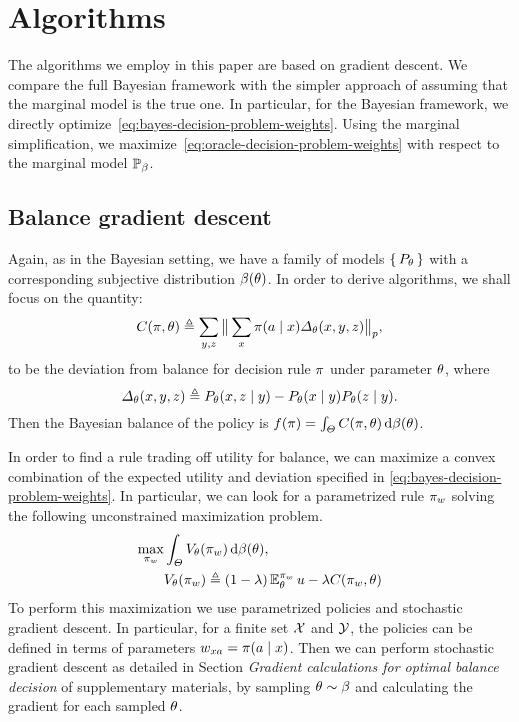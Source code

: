 \section{Algorithms} 
\label{sec:optim-balanc-bayes}
 
The algorithms we employ in this paper are based on gradient descent. We compare the full Bayesian framework with the simpler approach of assuming that the marginal model is the true one. In particular, for the Bayesian framework, we directly optimize~\eqref{eq:bayes-decision-problem-weights}. Using the marginal simplification, we maximize~\eqref{eq:oracle-decision-problem-weights} with respect to the marginal model $\mathop{\mbox{\ensuremath{\mathbb{P}}}}\nolimits_\beta$.


\subsection{Balance gradient descent}
\label{sec:credible-fairness}

Again, as in the Bayesian setting, we have a family of models
$\left\{\, P_\theta \,\right\}$ with a corresponding subjective distribution
$\beta(\theta)$. In order to derive algorithms, we shall focus on the quantity:
\begin{equation}
  C(\pi, \theta)
   \mathrel{\triangleq}
   \sum_{y,z} \big\|\sum_x \pi(a \mid x)  \Delta_\theta(x,y,z)\big\|_p,
\end{equation}
to be the deviation from balance for decision rule $\pi$ under
parameter $\theta$, where
\begin{equation}
  \Delta_\theta(x,y,z) \mathrel{\triangleq} P_\theta(x, z \mid y)
  - P_\theta(x \mid y) P_\theta(z \mid y).
\end{equation}
Then the Bayesian balance of the policy is $f(\pi) = \int_\Theta C(\pi,  \theta) \,\mathrm{d} \beta(\theta)$.

In order to find a rule trading off utility for balance, we can
maximize a convex combination of the expected utility and
deviation specified in \eqref{eq:bayes-decision-problem-weights}. In particular, we can look for a parametrized rule $\pi_w$
solving the following unconstrained maximization problem.
\begin{align}
  \max_{\pi_w} &
           \int_\Theta
           V_\theta(\pi_w)
           \,\mathrm{d} \beta(\theta),
\nonumber \\
&
  V_\theta(\pi_w) \mathrel{\triangleq} 
                (1 - \lambda) \mathop{\mbox{\ensuremath{\mathbb{E}}}}\nolimits_\theta^{\pi_w} u 
                - \lambda C(\pi_w, \theta)
  \label{eq:penalty}
\end{align}
To perform this maximization we use parametrized policies and
 stochastic gradient descent.  In particular, for a finite set
$\mathcal{X}$ and $\mathcal{Y}$, the policies can be defined in terms of parameters
$w_{xa} = \pi(a \mid x)$. Then we can perform stochastic gradient
descent as detailed in Section \emph{Gradient calculations for optimal balance decision} of supplementary materials, by sampling $\theta \sim \beta$ and calculating the gradient for each sampled $\theta$.


